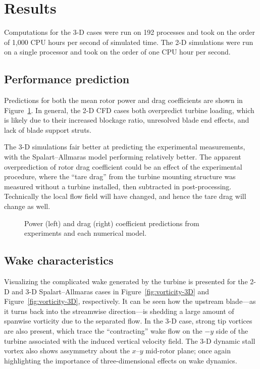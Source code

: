 \section{Results}

Computations for the 3-D cases were run on 192 processes and took on the order
of 1,000 CPU hours per second of simulated time. The 2-D simulations were run on
a single processor and took on the order of one CPU hour per second.


\subsection{Performance prediction}

Predictions for both the mean rotor power and drag coefficients are shown in
Figure~\ref{fig:perf-comp}. In general, the 2-D CFD cases both overpredict
turbine loading, which is likely due to their increased blockage ratio,
unresolved blade end effects, and lack of blade support struts.

The 3-D simulations fair better at predicting the experimental measurements,
with the Spalart--Allmaras model performing relatively better. The apparent
overprediction of rotor drag coefficient could be an effect of the experimental
procedure, where the ``tare drag'' from the turbine mounting structure was
measured without a turbine installed, then subtracted in post-processing.
Technically the local flow field will have changed, and hence the tare drag will
change as well.

\begin{figure}[ht]
    \centering


    \caption{Power (left) and drag (right) coefficient predictions from
        experiments and each numerical model.}

    \label{fig:perf-comp}
\end{figure}


\subsection{Wake characteristics}

Visualizing the complicated wake generated by the turbine is presented for the
2-D and 3-D Spalart--Allmaras cases in Figure~\ref{fig:vorticity-3D} and
Figure~\ref{fig:vorticity-3D}, respectively. It can be seen how the upstream
blade---as it turns back into the streamwise direction---is shedding a large
amount of spanwise vorticity due to the separated flow. In the 3-D case, strong
tip vortices are also present, which trace the ``contracting'' wake flow on the
$-y$ side of the turbine associated with the induced vertical velocity field.
The 3-D dynamic stall vortex also shows assymmetry about the $x$--$y$ mid-rotor
plane; once again highlighting the importance of three-dimensional effects on
wake dynamics.

